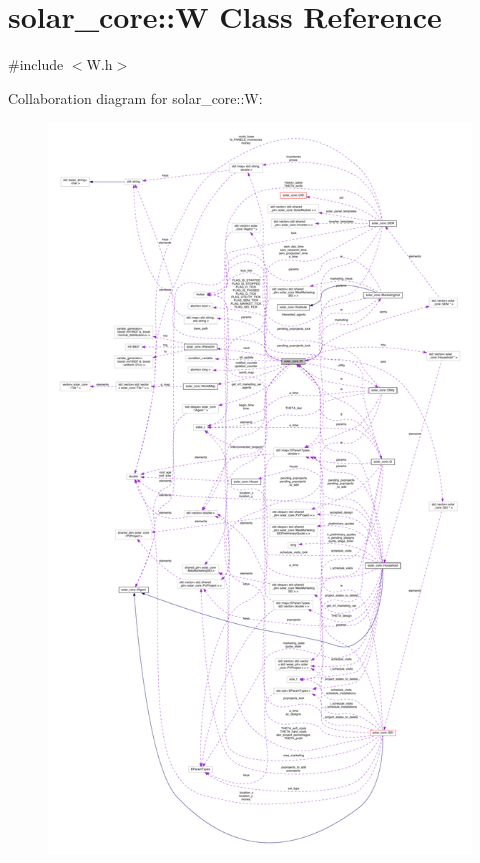 \hypertarget{classsolar__core_1_1_w}{}\section{solar\+\_\+core\+:\+:W Class Reference}
\label{classsolar__core_1_1_w}


{\ttfamily \#include $<$W.\+h$>$}



Collaboration diagram for solar\+\_\+core\+:\+:W\+:
\nopagebreak
\begin{figure}[H]
\begin{center}
\leavevmode
\includegraphics[height=550pt]{classsolar__core_1_1_w__coll__graph}
\end{center}
\end{figure}
